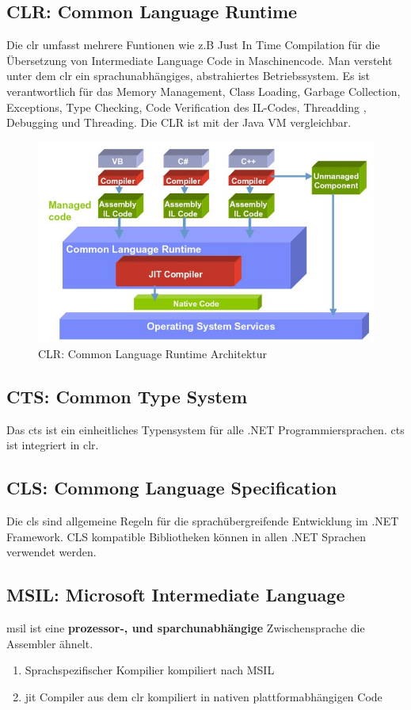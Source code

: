 \subsection{CLR: Common Language Runtime}
Die \gls{clr} umfasst mehrere Funtionen wie z.B Just In Time Compilation für die Übersetzung von Intermediate Language Code in Maschinencode. Man versteht unter dem \gls{clr} ein sprachunabhängiges, abstrahiertes Betriebssystem. Es ist verantwortlich für das Memory Management, Class Loading, Garbage Collection, Exceptions, Type Checking, Code Verification des IL-Codes, Threadding
, Debugging und Threading. Die CLR ist mit der Java VM vergleichbar.
\begin{figure}[h]
\centering
\includegraphics[width=0.6\linewidth]{images/common_language_runtime_architektur}
\caption{CLR: Common Language Runtime Architektur}
\label{fig:commonlanguageruntimearchitektur}
\end{figure}

\subsection{CTS: Common Type System}
Das \gls{cts} ist ein einheitliches Typensystem für alle .NET Programmiersprachen. \gls{cts} ist integriert in \gls{clr}. 

\subsection{CLS: Commong Language Specification}
Die \gls{cls} sind allgemeine Regeln für die sprachübergreifende Entwicklung im .NET Framework. CLS kompatible Bibliotheken können in allen .NET Sprachen verwendet werden.

\subsection{MSIL: Microsoft Intermediate Language}
\gls{msil} ist eine \textbf{prozessor-, und sparchunabhängige} Zwischensprache die Assembler ähnelt. 
\begin{enumerate}
	\item Sprachspezifischer Kompilier kompiliert nach MSIL
	\item \gls{jit} Compiler aus dem \gls{clr} kompiliert in nativen plattformabhängigen Code
\end{enumerate}
